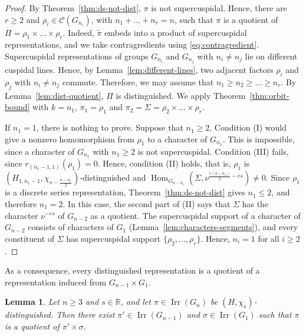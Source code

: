 \documentclass[11pt]{amsart}
\numberwithin{equation}{section}
\theoremstyle{plain}
\newtheorem{lemma}[theorem]{Lemma}
\theoremstyle{definition}
\theoremstyle{remark}
\newcommand{\R}{\mathbb{R}}
\DeclareMathOperator{\Hom}{Hom}
\DeclareMathOperator{\Irr}{Irr}
\begin{document}
\begin{proof}
	By Theorem~\ref{thm:ds-not-dist}, $\pi$ is not supercuspidal. Hence, there are $r\ge2$ and $\rho_i\in\mathcal C(G_{n_i})$, with $n_1+\dots+n_r=n$, such that $\pi$ is a quotient of $\Pi=\rho_1\times\dots\times\rho_r$. Indeed, $\widetilde\pi$ embeds into a product of supercuspidal representations, and we take contragredients using \eqref{eq:contragredient}. Supercuspidal representations of groups $G_{n_i}$ and $G_{n_j}$ with $n_i\ne n_j$ lie on different cuspidal lines. Hence, by Lemma~\ref{lem:different-lines}, two adjacent factors $\rho_i$ and $\rho_j$ with $n_i\ne n_j$ commute. Therefore, we may assume that $n_1\ge n_2\ge\dots\ge n_r$. By Lemma~\ref{lem:dist-quotient}, $\Pi$ is distinguished. We apply Theorem~\ref{thm:orbit-bound} with $k=n_1$, $\pi_1=\rho_1$ and $\pi_2=\Sigma=\rho_2\times\dots\times\rho_r$.
	
	If $n_1=1$, there is nothing to prove. Suppose that $n_1\ge2$. Condition (I) would give a nonzero homomorphism from $\rho_1$ to a character of $G_{n_1}$. This is impossible, since a character of $G_{n_1}$ with $n_1\ge2$ is not supercuspidal. Condition (III) fails, since $r_{(n_1-1,1)}(\rho_1)=0$. Hence, condition (II) holds, that is, $\rho_1$ is $(H_{1,n_1-1},\chi_{s-\frac{n-n_1}2})$-distinguished and $\Hom_{G_{n-n_1}}(\Sigma,\nu^{\frac{e(2-n_1)}2-es})\ne0$. Since $\rho_1$ is a discrete series representation, Theorem~\ref{thm:ds-not-dist} gives $n_1\le2$, and therefore $n_1=2$. In this case, the second part of (II) says that $\Sigma$ has the character $\nu^{-es}$ of $G_{n-2}$ as a quotient. The supercuspidal support of a character of $G_{n-2}$ consists of characters of $G_1$ (Lemma~\ref{lem:characters-segments}), and every constituent of $\Sigma$ has supercuspidal support $\{\rho_2,\dots,\rho_r\}$. Hence, $n_i=1$ for all $i\ge2$.
\end{proof}

As a consequence, every distinguished representation is a quotient of a representation induced from $G_{n-1}\times G_1$.

\begin{lemma}\label{lem:quotient-pi-sigma}
	Let $n\ge3$ and $s\in\R$, and let $\pi\in\Irr(G_n)$ be $(H,\chi_s)$-distinguished. Then there exist $\pi'\in\Irr(G_{n-1})$ and $\sigma\in\Irr(G_1)$ such that $\pi$ is a quotient of $\pi'\times\sigma$.
\end{lemma}
\end{document}
